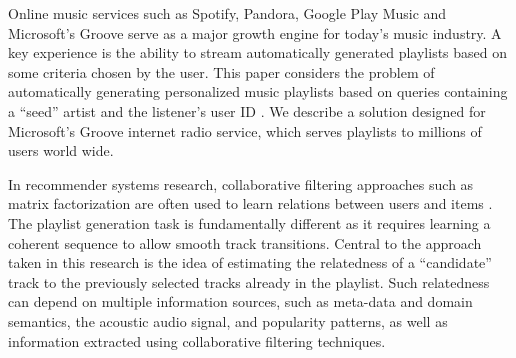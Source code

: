 Online music services such as Spotify, Pandora, Google Play Music and Microsoft's Groove serve as a major growth engine for today's music industry. A key experience is the ability to stream automatically generated playlists based on some criteria chosen by the user.
This paper considers the problem of automatically generating personalized music playlists based on queries containing a ``seed'' artist and the listener's user ID . We describe a solution designed for Microsoft's Groove internet radio  service, which serves playlists to millions of users world wide. 

In recommender systems research, collaborative filtering approaches such as matrix factorization are often used to learn relations between users and items \cite{KorenBV09}. 
The playlist generation task is fundamentally different as it requires learning a coherent sequence to allow smooth track transitions.
Central to the approach taken in this research is the idea of estimating the relatedness of a ``candidate'' track to the previously selected tracks already in the playlist.
Such relatedness can depend on multiple information sources, such as meta-data and domain semantics, the acoustic audio signal,  and popularity patterns, as well as information extracted using collaborative filtering techniques.  

